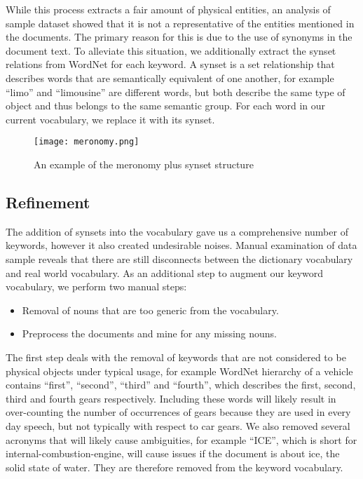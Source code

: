 While this process extracts a fair amount of physical entities, an analysis of
sample dataset showed that it is not a representative of the entities mentioned
in the documents. The primary reason for this is due to the use of synonyms
in the document text. To alleviate this situation, we additionally extract
the synset relations from WordNet for each keyword. A synset is a set
relationship that describes words that are semantically equivalent of one
another, for example ``limo'' and ``limousine'' are different words, but both
describe the same type of object and thus belongs to the same semantic group.
For each word in our current vocabulary, we replace it with its synset.


	\begin{figure}
	   \centering  
	   \texttt{[image: meronomy.png]}
	   \caption{An example of the meronomy plus synset structure}
	   \label{figure:meronomy}
	\end{figure}


\subsection{Refinement}
The addition of synsets into the vocabulary gave us a comprehensive number of
keywords, however it also created undesirable noises. Manual examination of data
sample reveals that there are still disconnects between the dictionary
vocabulary and real world vocabulary. As an additional step to augment our
keyword vocabulary, we perform two manual steps:

\begin{itemize} [noitemsep]
  \item Removal of nouns that are too generic from the vocabulary.
  \item Preprocess the documents and mine for any missing nouns.
\end{itemize}
The first step deals with the removal of keywords that are not considered to be
physical objects under typical usage, for example WordNet hierarchy of a
vehicle contains ``first'', ``second'', ``third'' and ``fourth'', which
describes the first, second, third and fourth gears respectively. Including
these words will likely result in over-counting the number of occurrences of
gears because they are used in every day speech, but not typically with respect
to car gears. We also removed several acronyms that will likely cause
ambiguities, for example ``ICE'', which is short for internal-combustion-engine,
will cause issues if the document is about ice, the solid state of water. They
are therefore removed from the keyword vocabulary.

